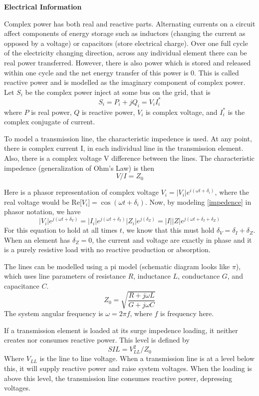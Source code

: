 \textbf{Electrical Information}

Complex power has both real and reactive parts.  Alternating currents  on a circuit affect components of energy storage such as inductors (changing the current as opposed by a voltage)  or capacitors (store electrical charge).  Over one full cycle of the electricity changing direction, across any individual element there can be real power transferred.  However, there is also power which is stored and released within one cycle and the net energy transfer of this power is 0.  This is called reactive power and is modelled as the imaginary component of complex power.  Let $S_i$ be the complex power inject at some bus on the grid, that is
\begin{equation}
S_i = P_i + j Q_i = V_i I_i^*
\end{equation}
where $P$ is real power, $Q$ is reactive power, $V_i$ is complex voltage, and $I_i^*$ is the complex conjugate of current.  
	
To model a transmission line, the characteristic impedence is used.  At any point, there is complex current I, in each individual line in the transmission element.  Also, there is a complex voltage V difference between the lines.  The characteristic impedence (generalization of Ohm's Law) is then
\begin{equation} \label{impedence}
V/I = Z_0
\end{equation}

Here is a phasor representation of complex voltage $V_i = | V_i | e^{i (\omega t + \delta_i) }$, where the real voltage would be Re[$V_i$]$=\cos (\omega t + \delta_i)$.  Now, by modeling \ref{impedence} in phasor notation, we have 
\begin{equation}
 | V_i | e^{j (\omega t + \delta_V) } = | I_i | e^{j (\omega t + \delta_I) }  | Z_i | e^{j ( \delta_Z) } = |I||Z|e^{j (\omega t + \delta_I + \delta_Z)}
\end{equation}
For this equation to hold at all times $t$, we know that this must hold $\delta_V = \delta_I + \delta_Z$.  When an element has $\delta_Z = 0$, the current and voltage are exactly in phase and it is a purely resistive load with no reactive production or absorption. 

The lines can be modelled using a pi model (schematic diagram looks like $\pi$), which uses line parameters of resistance $R$, inductance $L$, conductance $G$, and capacitance $C$. 
\begin{equation}
Z_0 = \sqrt{  \frac{R+j \omega L}{G+j\omega C} }
\end{equation}
The system angular frequency is $\omega = 2 \pi f$, where $f$ is frequency here.  

If a transmission element is loaded at its surge impedence loading, it neither creates nor consumes reactive power.  This level is defined by 
\begin{equation}
SIL = V_{LL}^2 / Z_0
\end{equation}
Where $V_{LL}$ is the line to line voltage.  When a transmission line is at a level below this, it will supply reactive power and raise system voltages.  When the loading is above this level, the transmission line consumes reactive power, depressing voltages.
